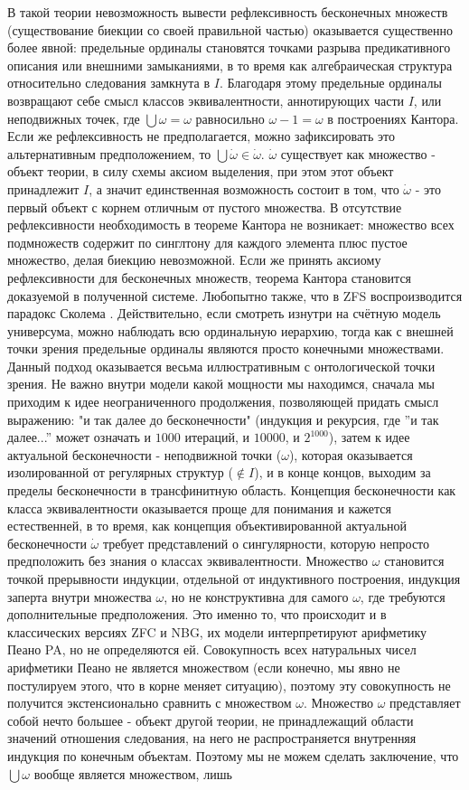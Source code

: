 \documentclass[12pt]{article}
\begin{document}
В такой теории невозможность вывести рефлексивность бесконечных множеств (существование биекции со своей правильной частью) оказывается существенно более явной: предельные ординалы становятся точками разрыва предикативного описания или внешними замыканиями, в то время как алгебраическая структура относительно следования замкнута в $I$. Благодаря этому предельные ординалы возвращают себе смысл классов эквивалентности, аннотирующих части $I$, или неподвижных точек, где $\bigcup \omega = \omega$ равносильно $\omega - 1 = \omega$ в построениях Кантора. Если же рефлексивность не предполагается, можно зафиксировать это альтернативным предположением, то $\bigcup \dot{\omega} \in \dot{\omega}$. $\dot{\omega}$ существует как множество - объект теории, в силу схемы аксиом выделения, при этом этот объект принадлежит $I$, а значит единственная возможность состоит в том, что $\dot{\omega}$ - это первый объект с корнем отличным от пустого множества. В отсутствие рефлексивности необходимость в теореме Кантора не возникает: множество всех подмножеств содержит по синглтону для каждого элемента плюс пустое множество, делая биекцию невозможной. Если же принять аксиому рефлексивности для бесконечных множеств, теорема Кантора становится доказуемой в полученной системе. Любопытно также, что в ZFS воспроизводится парадокс Сколема \cite{skolem-set-theory}. Действительно, если смотреть изнутри на счётную модель универсума, можно наблюдать всю ординальную иерархию, тогда как с внешней точки зрения предельные ординалы являются просто конечными множествами. Данный подход оказывается весьма иллюстративным с онтологической точки зрения. Не важно внутри модели какой мощности мы находимся, сначала мы приходим к идее неограниченного продолжения, позволяющей придать смысл выражению: "и так далее до бесконечности" (индукция и рекурсия, где ''и так далее...'' может означать и $1000$ итераций, и $10000$, и $2^{1000}$), затем к идее актуальной бесконечности - неподвижной точки ($\omega$), которая оказывается изолированной от регулярных структур ($\notin I$), и в конце концов, выходим за пределы бесконечности в трансфинитную область. Концепция бесконечности как класса эквивалентности оказывается проще для понимания и кажется естественней, в то время, как концепция объективированной актуальной бесконечности $\dot{\omega}$ требует представлений о сингулярности, которую непросто предположить без знания о классах эквивалентности. Множество $\omega$ становится точкой прерывности индукции, отдельной от индуктивного построения, индукция заперта внутри множества $\omega$, но не конструктивна для самого $\omega$, где требуются дополнительные предположения. Это именно то, что происходит и в классических версиях ZFC и NBG, их модели интерпретируют арифметику Пеано PA, но не определяются ей. Совокупность всех натуральных чисел арифметики Пеано не является множеством (если конечно, мы явно не постулируем этого, что в корне меняет ситуацию), поэтому эту совокупность не получится экстенсионально сравнить с множеством $\omega$. Множество $\omega$ представляет собой нечто большее - объект другой теории, не принадлежащий области значений отношения следования, на него не распространяется внутренняя индукция по конечным объектам. Поэтому мы не можем сделать заключение, что $\bigcup \omega$ вообще является множеством, лишь 
\end{document}
